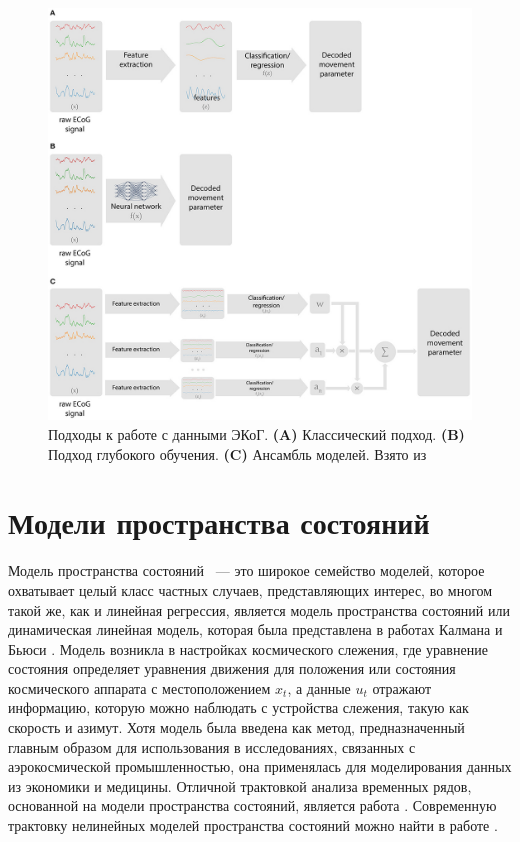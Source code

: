 \documentclass[a4paper, 12pt]{article}
\begin{document}
	\begin{figure}[bhtp]
		\includegraphics[width=\textwidth]{ecog-decoding-approaches.jpg}
		\caption{Подходы к работе с данными ЭКоГ. \textbf{(A)} Классический подход. \textbf{(B)} Подход глубокого обучения. \textbf{(C)} Ансамбль моделей. Взято из \citep{volkova2019decoding}}
		\label{fig:ecog-approaches}
	\end{figure}
		
	\section{Модели пространства состояний}
	Модель пространства состояний ~--- это широкое семейство моделей, которое охватывает целый класс частных случаев, представляющих интерес, во многом такой же, как и линейная регрессия, является модель пространства состояний или динамическая линейная модель, которая была представлена в работах Калмана и Бьюси \citep{kalman1961}.
	Модель возникла в настройках космического слежения, где уравнение состояния определяет уравнения движения для положения или состояния космического аппарата с местоположением $x_t$, а данные $u_t$ отражают информацию, которую можно наблюдать с устройства слежения, такую как скорость и азимут.
	Хотя модель была введена как метод, предназначенный главным образом для использования в исследованиях, связанных с аэрокосмической промышленностью, она применялась для моделирования данных из экономики \citep{harrison1976bayesian, harvey1984estimating, harvey1983forecasting} и медицины.
	Отличной трактовкой анализа временных рядов, основанной на модели пространства состояний, является работа \citep{durbin2002simple}. Современную трактовку нелинейных моделей пространства состояний можно найти в работе \citep{douc2014nonlinear}.
	
\end{document}
